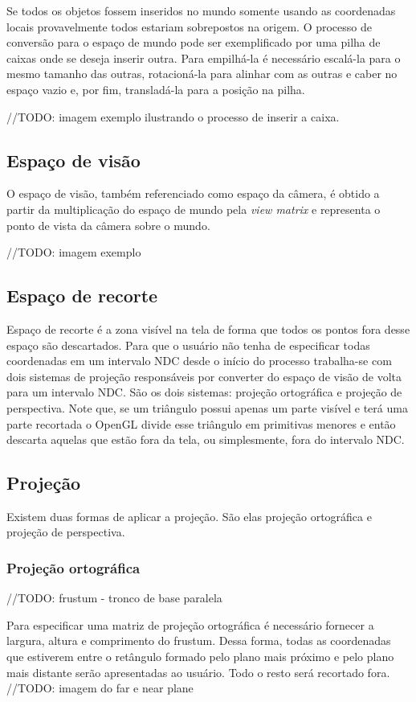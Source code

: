 \documentclass[12pt, 
openright, 
oneside, 
a4paper,    
brazil]{facom-ufu-abntex2}
\begin{document}
Se todos os objetos fossem inseridos no mundo somente usando as coordenadas locais provavelmente todos estariam sobrepostos na origem. O processo de conversão para o espaço de mundo pode ser exemplificado por uma pilha de caixas onde se deseja inserir outra. Para empilhá-la é necessário escalá-la para o mesmo tamanho das outras, rotacioná-la para alinhar com as outras e caber no espaço vazio e, por fim, transladá-la para a posição na pilha.

//TODO: imagem exemplo ilustrando o processo de inserir a caixa.

\subsection{Espaço de visão}
O espaço de visão, também referenciado como espaço da câmera, é obtido a partir da multiplicação do espaço de mundo pela \textit{view matrix} e representa o ponto de vista da câmera sobre o mundo.

//TODO: imagem exemplo

\subsection{Espaço de recorte}
Espaço de recorte é a zona visível na tela de forma que todos os pontos fora desse espaço são descartados. Para que o usuário não tenha de especificar todas coordenadas em um intervalo NDC desde o início do processo trabalha-se com dois sistemas de projeção responsáveis por converter do espaço de visão de volta para um intervalo NDC. São os dois sistemas: projeção ortográfica e projeção de perspectiva.
Note que, se um triângulo possui apenas um parte visível e terá uma parte recortada o OpenGL divide esse triângulo em primitivas menores e então descarta aquelas que estão fora da tela, ou simplesmente, fora do intervalo NDC.

\subsection{Projeção}

Existem duas formas de aplicar a projeção. São elas projeção ortográfica e projeção de perspectiva.

\subsubsection{Projeção ortográfica}
//TODO: frustum - tronco de base paralela

Para especificar uma matriz de projeção ortográfica é necessário fornecer a largura, altura e comprimento do frustum. Dessa forma, todas as coordenadas que estiverem entre o retângulo formado pelo plano mais próximo e pelo plano mais distante serão apresentadas ao usuário. Todo o resto será recortado fora.
//TODO: imagem do far e near plane
\end{document}
